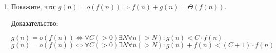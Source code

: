 \documentclass{article}
\begin{document}
\begin{enumerate}
$
g(n) = 
     \begin{cases}
       \text{1,} &\text{если n-\text{нечётн.}}\\
       \text{n,} &\text{если n-\text{чётн.}}\\
     \end{cases} 
$

$f \neq \mathcal{O}(g)$ и $g \neq \mathcal{O}(f)$.

Значит и для классов ``$\preceq$'' не является отношением линейного порядка.

\item Покажите, что: $g(n) = o(f (n)) \Rightarrow f (n) + g(n) = \Theta(f (n))$.

Доказательство:

$g(n) = o(f(n)) \Leftrightarrow \forall C(>0) \exists N \forall n(>N) : g(n) < C \cdot f(n)$\\
$g(n) = o(f(n)) \Leftrightarrow \forall C(>0) \exists N \forall n(>N) : g(n) + f(n) < (C + 1) \cdot f(n)$\\

\end{enumerate}
\end{document}
